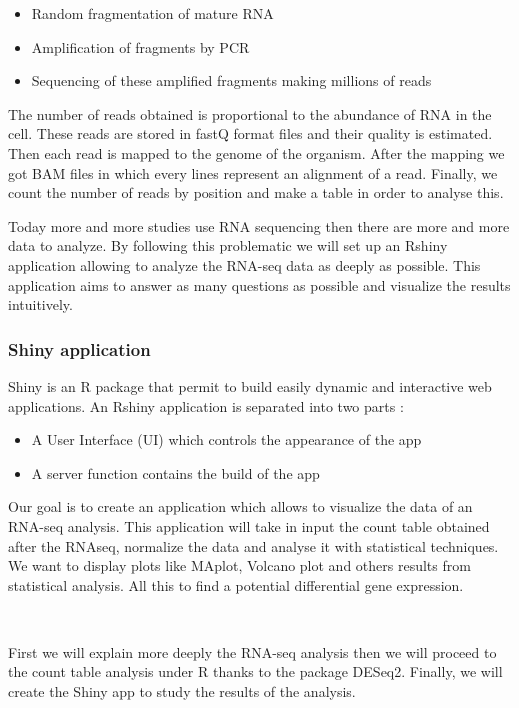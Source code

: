 \documentclass[]{article}
\begin{document}
\begin{itemize}
\item
  Random fragmentation of mature RNA
\item
  Amplification of fragments by PCR
\item
  Sequencing of these amplified fragments making millions of reads
\end{itemize}

The number of reads obtained is proportional to the abundance of RNA in
the cell. These reads are stored in fastQ format files and their quality
is estimated. Then each read is mapped to the genome of the organism.
After the mapping we got BAM files in which every lines represent an
alignment of a read. Finally, we count the number of reads by position
and make a table in order to analyse this.

Today more and more studies use RNA sequencing then there are more and
more data to analyze. By following this problematic we will set up an
Rshiny application allowing to analyze the RNA-seq data as deeply as
possible. This application aims to answer as many questions as possible
and visualize the results intuitively.

\subsubsection{Shiny application}\label{shiny-application}

Shiny is an R package that permit to build easily dynamic and
interactive web applications. An Rshiny application is separated into
two parts :

\begin{itemize}
\item
  A User Interface (UI) which controls the appearance of the app
\item
  A server function contains the build of the app\\
\end{itemize}

Our goal is to create an application which allows to visualize the data
of an RNA-seq analysis. This application will take in input the count
table obtained after the RNAseq, normalize the data and analyse it with
statistical techniques. We want to display plots like MAplot, Volcano
plot and others results from statistical analysis. All this to find a
potential differential gene expression.

~

First we will explain more deeply the RNA-seq analysis then we will
proceed to the count table analysis under R thanks to the package
DESeq2. Finally, we will create the Shiny app to study the results of
the analysis.
\end{document}
